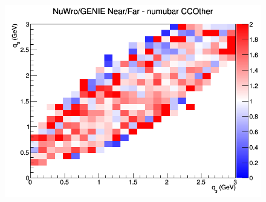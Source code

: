 \documentclass[12pt]{article}
\begin{document}
\begin{figure}[h]
\endminipage
{}
\includegraphics[width=\linewidth]{eff_q0_q3/FGT/ratios/CCOther_NuWro_GENIE_numubar_NF_q3_q0.png}
\endminipage
\newline
\end{figure}
\clearpage
\end{document}

